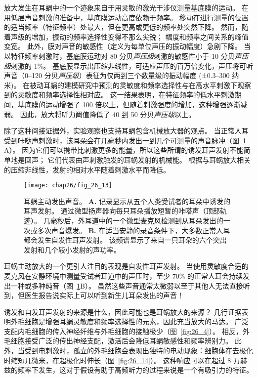 放大发生在耳蜗中的一个迹象来自于用灵敏的激光干涉仪测量基底膜的运动。
在用低层声音刺激的准备中，基底膜运动高度依赖于频率。
移动在进行测量的位置的适当频率（特征频率）处最大，但在更高或更低的频率处突然下降。
然而，随着声级的增加，振动的频率选择性变得不那么尖锐；
幅度和频率之间关系的峰值变宽。
此外，膜对声音的敏感性（定义为每单位声压的振动幅度）急剧下降。
当以特征频率刺激时，基底膜运动对 80 分贝\textit{声压级}刺激的敏感性小于 10 分贝\textit{声压级}刺激的 1\%。
基底膜显示出压缩非线性，可适应声压的百万倍变化，声压将可听声音（0–120 分贝\textit{声压级}）表征为仅两到三个数量级的振动幅度 (±0.3–300 纳米)。
在被动耳蜗的建模研究中预测的灵敏度和频率选择性与在高水平刺激下观察到的灵敏度和频率选择性相对应。
这一结果表明，在特征频率的低水平刺激期间，基底膜的运动增强了 100 倍以上，但随着刺激强度的增加，这种增强逐渐减弱。
因此，放大将听力阈值降低了 40 到 50 分贝\textit{声压级}以上。


除了这种间接证据外，实验观察也支持耳蜗包含机械放大器的观点。
当正常人耳受到咔哒声刺激时，该耳朵会在几毫秒内发出一到几个可测量的声音脉冲（图~\ref{fig:26_13} A）。
因为它们可以携带比刺激更多的能量，所以这些所谓的诱发耳声发射不能简单地是回声；
它们代表由声刺激触发的耳蜗发射的机械能。
根据与耳蜗放大相关的压缩非线性，发射的相对水平随着刺激水平而降低。


\begin{figure}[htbp]
	\centering
	\texttt{[image: chap26/fig\_26\_13]}
	\caption{耳蜗主动发出声音。
		\textbf{A.} 记录显示从五个人类受试者的耳朵中诱发的耳声发射。
		通过微型扬声器向每只耳朵播放短暂的咔嗒声（顶部轨迹）。
		几毫秒后，外耳道中的一个微型麦克风检测到从耳朵发出的一次或多次声音爆发\cite{wilson1980evidence}。
		\textbf{B.} 在适当安静的录音条件下，大多数正常人耳都会发生自发性耳声发射。
		该频谱显示了来自一只耳朵的六个突出发射和几个较小发射的声功率\cite{murphy1995relaxation}。}
	\label{fig:26_13}
\end{figure}


耳蜗主动放大的一个更引人注目的表现是自发性耳声发射。
当使用灵敏度合适的麦克风在安静环境中测量受试者耳道中的声压时，至少 70\% 的正常人耳会持续发出一种或多种纯音（图~\ref{fig:26_13}B）。
虽然这些声音通常太微弱以至于其他人无法直接听到，但医生报告说实际上可以听到新生儿耳朵发出的声音！


诱发和自发耳声发射的来源是什么，因此可能也是耳蜗放大的来源？
几行证据表明外毛细胞是增强耳蜗灵敏度和频率选择性的元素，因此充当放大的马达。
广泛支配内毛细胞的传入神经纤维与外毛细胞的接触极少（图~\ref{fig:26_4}）。
相反，外毛细胞接受广泛的传出神经支配，激活后会降低耳蜗敏感性和频率辨别力。
此外，当受到电刺激时，孤立的外毛细胞会表现出独特的电动现象：细胞体在去极化时缩短几微米，在超极化时伸长（图~\ref{fig:26_14}）。
这种响应可以在超过 8 万赫兹的频率下发生，这对于假设有助于高频听力的过程来说是一个有吸引力的特征。



